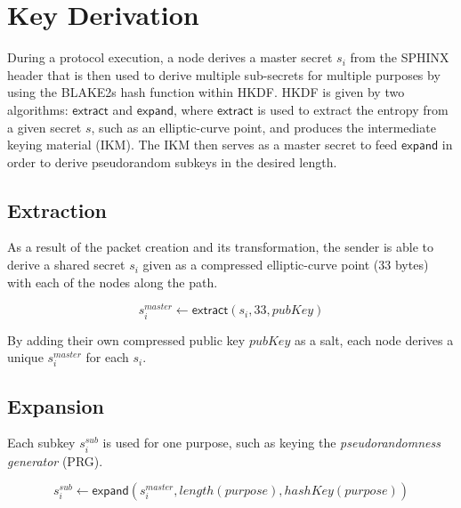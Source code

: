 \section{Key Derivation}
\label{appendix:keyderivation}

During a protocol execution, a node derives a master secret $s_i$ from the SPHINX header that is then used to derive multiple sub-secrets for multiple purposes by using the BLAKE2s hash function within HKDF. HKDF is given by two algorithms: $\mathsf{extract}$ and $\mathsf{expand}$, where $\mathsf{extract}$ is used to extract the entropy from a given secret $s$, such as an elliptic-curve point, and produces the intermediate keying material (IKM). The IKM then serves as a master secret to feed $\mathsf{expand}$ in order to derive pseudorandom subkeys in the desired length.

\subsection{Extraction}

As a result of the packet creation and its transformation, the sender is able to derive a shared secret $s_i$ given as a compressed elliptic-curve point (33 bytes) with each of the nodes along the path.

$$s_i^{master} \longleftarrow \mathsf{extract}(s_i, 33, pubKey)$$

By adding their own compressed public key $pubKey$ as a salt, each node derives a unique $s_i^{master}$ for each $s_i$.

\subsection{Expansion}

Each subkey $s_i^{sub}$ is used for one purpose, such as keying the \textit{pseudorandomness generator} (PRG).

$$s_i^{sub} \longleftarrow \mathsf{expand}(s_i^{master}, length(purpose), hashKey(purpose))$$

